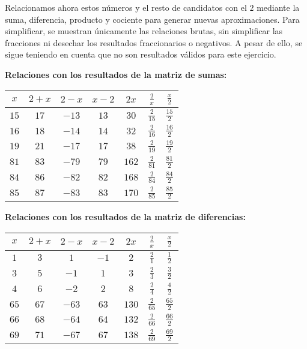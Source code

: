 Relacionamos ahora estos números y el resto de candidatos con el $2$ mediante la suma, diferencia, producto y cociente para generar nuevas aproximaciones.
Para simplificar, se muestran únicamente las relaciones brutas, sin simplificar las fracciones ni desechar los resultados fraccionarios o negativos.
A pesar de ello, se sigue teniendo en cuenta que no son resultados válidos para este ejercicio.

\pagebreak

\begin{center}
\textbf{Relaciones con los resultados de la matriz de sumas:}

\begin{tabular}{c c c c c c c}
$x$  & $2+x$ & $2-x$ & $x-2$ & $2x$  & $\frac{2}{x}$  & $\frac{x}{2}$  \\
\midrule
$15$ & $17$  & $-13$ & $13$  & $30$  & $\frac{2}{15}$ & $\frac{15}{2}$ \\
$16$ & $18$  & $-14$ & $14$  & $32$  & $\frac{2}{16}$ & $\frac{16}{2}$ \\
$19$ & $21$  & $-17$ & $17$  & $38$  & $\frac{2}{19}$ & $\frac{19}{2}$ \\
$81$ & $83$  & $-79$ & $79$  & $162$ & $\frac{2}{81}$ & $\frac{81}{2}$ \\
$84$ & $86$  & $-82$ & $82$  & $168$ & $\frac{2}{84}$ & $\frac{84}{2}$ \\
$85$ & $87$  & $-83$ & $83$  & $170$ & $\frac{2}{85}$ & $\frac{85}{2}$ \\
\end{tabular}
\end{center}

\begin{center}
\textbf{Relaciones con los resultados de la matriz de diferencias:}

\begin{tabular}{c c c c c c c}
$x$  & $2+x$ & $2-x$ & $x-2$ & $2x$  & $\frac{2}{x}$  & $\frac{x}{2}$  \\
\midrule
$1$  & $3$   & $1$   & $-1$  & $2$   & $\frac{2}{1}$  & $\frac{1}{2}$  \\
$3$  & $5$   & $-1$  & $1$   & $3$   & $\frac{2}{3}$  & $\frac{3}{2}$  \\
$4$  & $6$   & $-2$  & $2$   & $8$   & $\frac{2}{4}$  & $\frac{4}{2}$  \\
$65$ & $67$  & $-63$ & $63$  & $130$ & $\frac{2}{65}$ & $\frac{65}{2}$ \\
$66$ & $68$  & $-64$ & $64$  & $132$ & $\frac{2}{66}$ & $\frac{66}{2}$ \\
$69$ & $71$  & $-67$ & $67$  & $138$ & $\frac{2}{69}$ & $\frac{69}{2}$ \\
\end{tabular}
\end{center}

